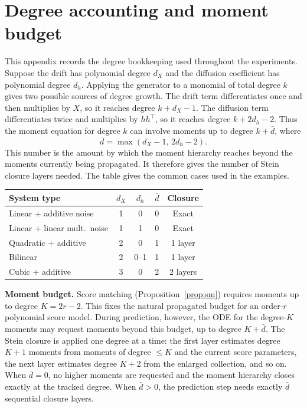 \documentclass{article}
\theoremstyle{definition}
\begin{document}
\section{Degree accounting and moment budget}
\label{app:degree}

This appendix records the degree bookkeeping used throughout the
experiments. Suppose the drift has polynomial degree $d_X$ and the
diffusion coefficient has polynomial degree $d_h$. Applying the generator
to a monomial of total degree $k$ gives two possible sources of degree
growth. The drift term differentiates once and then multiplies by $X$,
so it reaches degree $k+d_X-1$. The diffusion term differentiates twice
and multiplies by $h h^\top$, so it reaches degree $k+2d_h-2$.
Thus the moment equation for degree $k$ can involve moments up to
degree $k+\bar d$, where
\[
    \bar{d} = \max(d_X{-}1,\,2d_h{-}2).
\]
This number is the amount by which the moment hierarchy reaches beyond
the moments currently being propagated. It therefore gives the number
of Stein closure layers needed. The table gives the common cases used
in the examples.

\begin{center}
\renewcommand{\arraystretch}{1.3}
\begin{tabular}{p{4cm}cccc}
\toprule
\textbf{System type} & $d_X$ & $d_h$ & $\bar{d}$ & \textbf{Closure} \\
\midrule
Linear + additive noise & 1 & 0 & 0 & Exact \\
Linear + linear mult.\ noise & 1 & 1 & 0 & Exact \\
Quadratic + additive & 2 & 0 & 1 & 1 layer \\
Bilinear & 2 & 0--1 & 1 & 1 layer \\
Cubic + additive & 3 & 0 & 2 & 2 layers \\
\bottomrule
\end{tabular}
\end{center}

\textbf{Moment budget.}
Score matching (Proposition~\ref{prop:sm}) requires moments up to degree
$K = 2r{-}2$.
This fixes the natural propagated budget for an order-$r$ polynomial
score model. During prediction, however, the ODE for the degree-$K$
moments may request moments beyond this budget, up to degree
$K+\bar d$. The Stein closure is applied one degree at a time: the first
layer estimates degree $K+1$ moments from moments of degree $\le K$ and
the current score parameters, the next layer estimates degree $K+2$ from
the enlarged collection, and so on. When $\bar d=0$, no higher moments
are requested and the moment hierarchy closes exactly at the tracked
degree. When $\bar d>0$, the prediction step needs exactly $\bar d$
sequential closure layers.
\end{document}
